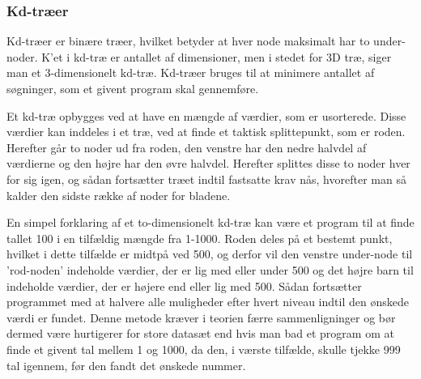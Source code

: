 \subsubsection{Kd-træer}
\label{sec:kdtree}

Kd-træer er binære træer, hvilket betyder at hver node maksimalt har to under-noder. K'et i kd-træ er antallet af dimensioner, men i stedet for 3D træ, siger man et 3-dimensionelt kd-træ. Kd-træer bruges til at minimere antallet af søgninger, som et givent program skal gennemføre. 

Et kd-træ opbygges ved at have en mængde af værdier, som er usorterede. Disse værdier kan inddeles i et træ, ved at finde et taktisk splittepunkt, som er roden. Herefter går to noder ud fra roden, den venstre har den nedre halvdel af værdierne og den højre har den øvre halvdel. Herefter splittes disse to noder hver for sig igen, og sådan fortsætter træet indtil fastsatte krav nås, hvorefter man så kalder den sidste række af noder for bladene. 

En simpel forklaring af et to-dimensionelt kd-træ kan være et program til at finde tallet 100 i en tilfældig mængde fra 1-1000. Roden deles på et bestemt punkt, hvilket i dette tilfælde er midtpå ved 500, og derfor vil den venstre under-node til 'rod-noden' indeholde værdier, der er lig med eller under 500 og det højre barn til indeholde værdier, der er højere end eller lig med 500. Sådan fortsætter programmet med at halvere alle muligheder efter hvert niveau indtil den ønskede værdi er fundet. Denne metode kræver i teorien færre sammenligninger og bør dermed være hurtigerer for store datasæt end hvis man bad et program om at finde et givent tal mellem 1 og 1000, da den, i værste tilfælde, skulle tjekke 999 tal igennem, før den fandt det ønskede nummer.
